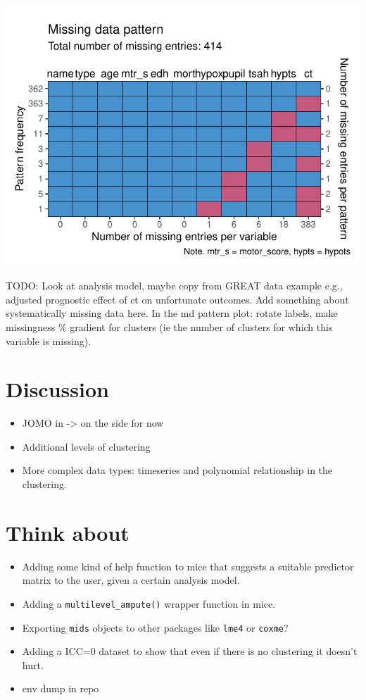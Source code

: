\documentclass[
]{jss}
\begin{document}
\begin{CodeChunk}
\begin{center}\includegraphics{Manuscript_files/figure-latex/impact-3} \end{center}

\end{CodeChunk}

TODO: Look at analysis model, maybe copy from GREAT data example e.g.,
adjusted prognostic effect of ct on unfortunate outcomes. Add something
about systematically missing data here. In the md pattern plot: rotate
labels, make missingness \% gradient for clusters (ie the number of
clusters for which this variable is missing).

\hypertarget{discussion}{%
\section{Discussion}\label{discussion}}

\begin{itemize}
\item
  JOMO in  -\textgreater{} on the side for now
\item
  Additional levels of clustering
\item
  More complex data types: timeseries and polynomial relationship in the
  clustering.
\end{itemize}

\hypertarget{think-about}{%
\section{Think about}\label{think-about}}

\begin{itemize}
\item
  Adding some kind of help function to mice that suggests a suitable
  predictor matrix to the user, given a certain analysis model.
\item
  Adding a \texttt{multilevel\_ampute()} wrapper function in mice.
\item
  Exporting \texttt{mids} objects to other packages like \texttt{lme4}
  or \texttt{coxme}?
\item
  Adding a ICC=0 dataset to show that even if there is no clustering it
  doesn't hurt.
\item
  env dump in repo
\end{itemize}

\renewcommand\refname{References}

\end{document}
